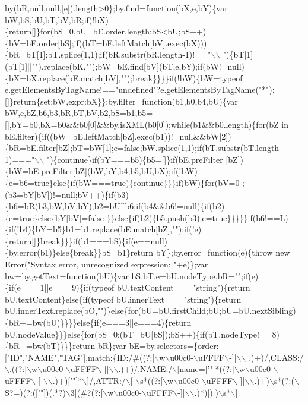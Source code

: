 \begin{DoxyCode}
{       by(bR,null,null,[e]).length>0\};by.find=function(bX,e,bY)\{var
       bW,bS,bU,bT,bV,bR;if(!bX)\{return[]\}for(bS=0,bU=bE.order.length;bS<bU;bS++)\{bV=bE.order[bS];if((bT=bE.leftMatch[bV].exec(bX)))\{bR=bT[1];bT.splice(1,1);if(bR.substr(bR.length-1)!=="\(\backslash\)\(\backslash\)
      ")\{bT[1]
      =(bT[1]||"").replace(bK,"");bW=bE.find[bV](bT,e,bY);if(bW!=null)\{bX=bX.replace(bE.match[bV],"");break\}\}\}\}if(!bW)\{bW=typeof
       e.getElementsByTagName!=="undefined"?e.getElementsByTagName("*"):[]\}return\{set:bW,expr:bX\}\};by.filter=function(b1,b0,b4,bU)\{var
       bW,e,bZ,b6,b3,bR,bT,bV,b2,bS=b1,b5=[],bY=b0,bX=b0&&b0[0]&&by.isXML(b0[0]);while(b1&&b0.length)\{for(bZ in
       bE.filter)\{if((bW=bE.leftMatch[bZ].exec(b1))!=null&&bW[2])\{bR=bE.filter[bZ];bT=bW[1];e=false;bW.splice(1,1);if(bT.substr(bT.length-1)==="\(\backslash\)\(\backslash\)
      ")\{continue\}if(bY===b5)\{b5=[]\}if(bE.preFilter
      [bZ])\{bW=bE.preFilter[bZ](bW,bY,b4,b5,bU,bX);if(!bW)\{e=b6=true\}else\{if(bW===true)\{continue\}\}\}if(bW)\{for(bV=0
      ;(b3=bY[bV])!=null;bV++)\{if(b3)\{b6=bR(b3,bW,bV,bY);b2=bU^b6;if(b4&&b6!=null)\{if(b2)\{e=true\}else\{bY[bV]=false
      \}\}else\{if(b2)\{b5.push(b3);e=true\}\}\}\}\}if(b6!==L)\{if(!b4)\{bY=b5\}b1=b1.replace(bE.match[bZ],"");if(!e)\{return[]\}break\}\}\}if(b1===bS)\{if(e==null)\{by.error(b1)\}else\{break\}\}bS=b1\}return bY\};by.error=function(e)\{throw new
       Error("Syntax error, unrecognized expression: "+e)\};var bw=by.getText=function(bU)\{var
       bS,bT,e=bU.nodeType,bR="";if(e)\{if(e===1||e===9)\{if(typeof bU.textContent==="string")\{return bU.textContent\}else\{if(typeof
       bU.innerText==="string")\{return
       bU.innerText.replace(bO,"")\}else\{for(bU=bU.firstChild;bU;bU=bU.nextSibling)\{bR+=bw(bU)\}\}\}\}else\{if(e===3||e===4)\{return
       bU.nodeValue\}\}\}else\{for(bS=0;(bT=bU[bS]);bS++)\{if(bT.nodeType!==8)\{bR+=bw(bT)\}\}\}return bR\};var bE=by.selectors=\{order:["ID","NAME","TAG"],match:\{ID:/#((?:[\(\backslash\)w\(\backslash\)u00c0-\(\backslash\)uFFFF\(\backslash\)-]|\(\backslash\)\(\backslash\)
      .)+)/,CLASS:/\(\backslash\).((?:[\(\backslash\)w\(\backslash\)u00c0-\(\backslash\)uFFFF\(\backslash\)-]|\(\backslash\)\(\backslash\).)+)/,NAME:/\(\backslash\)[name=['}\textcolor{stringliteral}{"]*((?:[\(\backslash\)w\(\backslash\)u00c0-\(\backslash\)uFFFF\(\backslash\)-]|\(\backslash\)\(\backslash\).)+)['"}]*\(\backslash\)]/,ATTR:/\(\backslash\)[
      \(\backslash\)s*((?:[\(\backslash\)w\(\backslash\)u00c0-\(\backslash\)uFFFF\(\backslash\)-]|\(\backslash\)\(\backslash\).)+)\(\backslash\)s*(?:(\(\backslash\)S?=)\s*(?:([\textcolor{stringliteral}{'"])(.*?)\(\backslash\)3|(#?(?:[\(\backslash\)w\(\backslash\)u00c0-\(\backslash\)uFFFF\(\backslash\)-]|\(\backslash\)\(\backslash\).)*)|)|)\(\backslash\)s*\(\backslash\)]
}
\end{DoxyCode}
